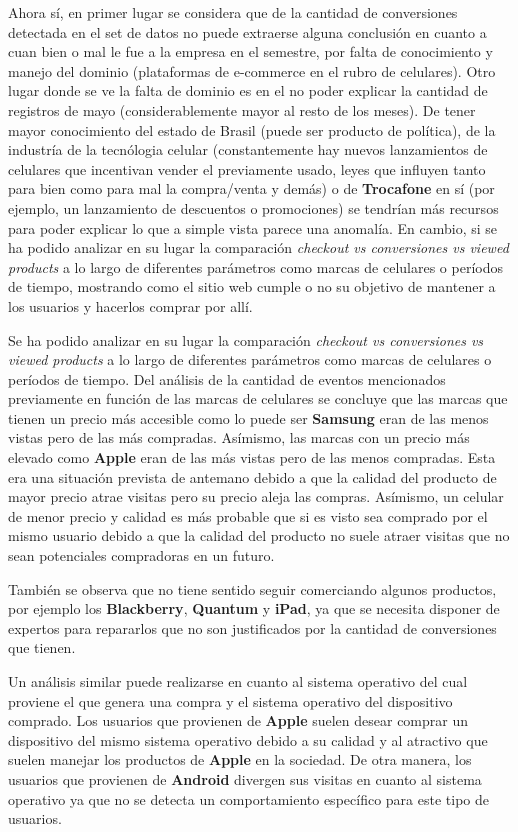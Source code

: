 \documentclass[a4paper]{article}
\begin{document}
Ahora sí, en primer lugar se considera que de la cantidad de conversiones detectada en el set de datos no puede extraerse alguna conclusión en cuanto a cuan bien o mal le fue a la empresa en el semestre, por falta de conocimiento y manejo del dominio (plataformas de e-commerce en el rubro de celulares). Otro lugar donde se ve la falta de dominio es en el no poder explicar la cantidad de registros de mayo (considerablemente mayor al resto de los meses). De tener mayor conocimiento del estado de Brasil (puede ser producto de política), de la industría de la tecnólogia celular (constantemente hay nuevos lanzamientos de celulares que incentivan vender el previamente usado, leyes que influyen tanto para bien como para mal la compra/venta y demás) o de \textbf{Trocafone} en sí (por ejemplo, un lanzamiento de descuentos o promociones) se tendrían más recursos para poder explicar lo que a simple vista parece una anomalía. En cambio, si se ha podido analizar en su lugar la comparación \textit{checkout vs conversiones vs viewed products} a lo largo de diferentes parámetros como marcas de celulares o períodos de tiempo, mostrando como el sitio web cumple o no su objetivo de mantener a los usuarios y hacerlos comprar por allí.

Se ha podido analizar en su lugar la comparación \textit{checkout vs conversiones vs viewed products} a lo largo de diferentes parámetros como marcas de celulares o períodos de tiempo. Del análisis de la cantidad de eventos mencionados previamente en función de las marcas de celulares se concluye que las marcas que tienen un precio más accesible como lo puede ser \textbf{Samsung} eran de las menos vistas pero de las más compradas. Asímismo, las marcas con un precio más elevado como \textbf{Apple} eran de las más vistas pero de las menos compradas. Esta era una situación prevista de antemano debido a que la calidad del producto de mayor precio atrae visitas pero su precio aleja las compras. Asímismo, un celular de menor precio y calidad es más probable que si es visto sea comprado por el mismo usuario debido a que la calidad del producto no suele atraer visitas que no sean potenciales compradoras en un futuro. 

También se observa que no tiene sentido seguir comerciando algunos productos, por ejemplo los \textbf{Blackberry}, \textbf{Quantum} y  \textbf{iPad}, ya que se necesita disponer de expertos para repararlos que no son justificados por la cantidad de conversiones que tienen.

Un análisis similar puede realizarse en cuanto al sistema operativo del cual proviene el que genera una compra y el sistema operativo del dispositivo comprado. Los usuarios que provienen de \textbf{Apple} suelen desear comprar un dispositivo del mismo sistema operativo debido a su calidad y al atractivo que suelen manejar los productos de \textbf{Apple} en la sociedad. De otra manera, los usuarios que provienen de \textbf{Android} divergen sus visitas en cuanto al sistema operativo ya que no se detecta un comportamiento específico para este tipo de usuarios.
\end{document}
